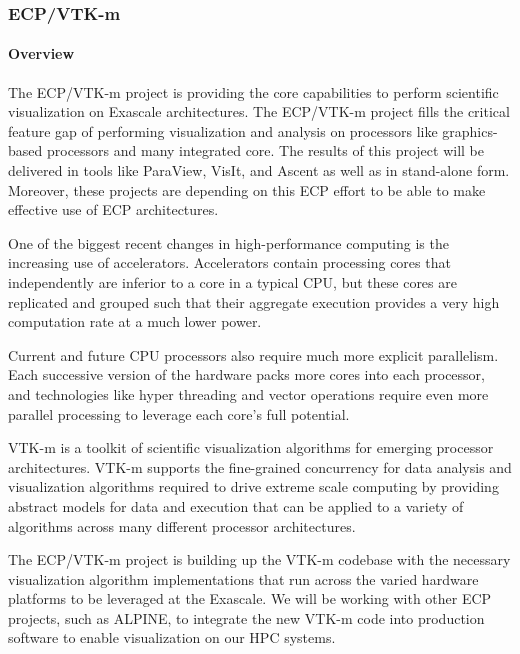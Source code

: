 
\subsubsection{ECP/VTK-m}

\paragraph{Overview}
The ECP/VTK-m project is providing the core capabilities to perform scientific visualization on Exascale architectures.
The ECP/VTK-m project fills the critical feature gap of performing visualization and analysis on processors like graphics-based processors and many integrated core.
The results of this project will be delivered in tools like ParaView, VisIt, and Ascent as well as in stand-alone form.
Moreover, these projects are depending on this ECP effort to be able to make effective use of ECP architectures.

One of the biggest recent changes in high-performance computing is the increasing use of accelerators.
Accelerators contain processing cores that independently are inferior to a core in a typical CPU, but these cores are replicated and grouped such that their aggregate execution provides a very high computation rate at a much lower power.

Current and future CPU processors also require much more explicit parallelism.
Each successive version of the hardware packs more cores into each processor, and technologies like hyper threading and vector operations require even more parallel processing to leverage each core's full potential.

VTK-m is a toolkit of scientific visualization algorithms for emerging processor architectures.
VTK-m supports the fine-grained concurrency for data analysis and visualization algorithms required to drive extreme scale computing by providing abstract models for data and execution that can be applied to a variety of algorithms across many different processor architectures.

The ECP/VTK-m project is building up the VTK-m codebase with the necessary visualization algorithm implementations that run across the varied hardware platforms to be leveraged at the Exascale.
We will be working with other ECP projects, such as ALPINE, to integrate the new VTK-m code into production software to enable visualization on our HPC systems.

